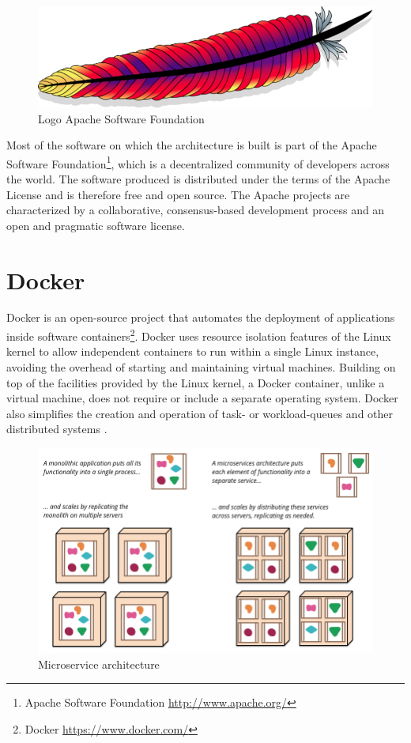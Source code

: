 \begin{figure}[ht!]
\centering
\includegraphics[width=.6\textwidth]{figures/asf.png}
\caption{Logo Apache Software Foundation}
\label{fig:asf}
\end{figure}

Most of the software on which the architecture is built is part of the Apache Software Foundation\footnote{Apache Software Foundation \url{http://www.apache.org/}}, which is a decentralized community of developers across the world. The software produced is distributed under the terms of the Apache License and is therefore free and open source. The Apache projects are characterized by a collaborative, consensus-based development process and an open and pragmatic software license.

\section{Docker \label{subsec_docker}}

Docker is an open-source project that automates the deployment of applications inside software containers\footnote{Docker \url{https://www.docker.com/}}. Docker uses resource isolation features of the Linux kernel to allow independent containers to run within a single Linux instance, avoiding the overhead of starting and maintaining virtual machines. Building on top of the facilities provided by the Linux kernel, a Docker container, unlike a virtual machine, does not require or include a separate operating system. Docker also simplifies the creation and operation of task- or workload-queues and other distributed systems \cite{docker1,docker2}.

\begin{figure}[ht!]
\centering
\includegraphics[width=\textwidth]{figures/microservice.png}
\caption{Microservice architecture \cite{microservice} \label{fig:microservice}}
\end{figure}

